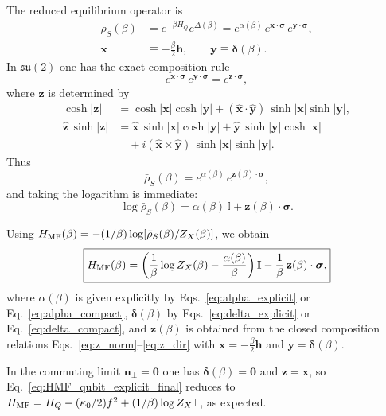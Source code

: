 The reduced equilibrium operator is
\begin{align}
    \bar\rho_S(\beta)&=e^{-\beta H_Q}e^{\Delta(\beta)}
    = e^{\alpha(\beta)}\,e^{\mathbf x\cdot\boldsymbol\sigma}\,e^{\mathbf y\cdot\boldsymbol\sigma}, \nonumber\\
    \mathbf x&\equiv -\frac{\beta}{2}\mathbf h,
    \qquad
    \mathbf y\equiv \boldsymbol\delta(\beta).
    \label{eq:bar_rho_qubit_xy}
\end{align}
In $\mathfrak{su}(2)$ one has the exact composition rule
\begin{equation}
    e^{\mathbf x\cdot\boldsymbol\sigma}\,e^{\mathbf y\cdot\boldsymbol\sigma}
    = e^{\mathbf z\cdot\boldsymbol\sigma},
    \label{eq:su2_comp_rule}
\end{equation}
where $\mathbf z$ is determined by
\begin{align}
    \cosh|\mathbf z|
    &=
    \cosh|\mathbf x|\cosh|\mathbf y|
    + (\hat{\mathbf x}\cdot\hat{\mathbf y})\,\sinh|\mathbf x|\sinh|\mathbf y|,
    \label{eq:z_norm}\\
    \hat{\mathbf z}\,\sinh|\mathbf z|
    &=
    \hat{\mathbf x}\,\sinh|\mathbf x|\cosh|\mathbf y|
    + \hat{\mathbf y}\,\sinh|\mathbf y|\cosh|\mathbf x| \nonumber\\
    &\quad + i(\hat{\mathbf x}\times\hat{\mathbf y})\,\sinh|\mathbf x|\sinh|\mathbf y|.
    \label{eq:z_dir}
\end{align}
Thus
\begin{equation}
    \bar\rho_S(\beta)=e^{\alpha(\beta)}\,e^{\mathbf z(\beta)\cdot\boldsymbol\sigma},
\end{equation}
and taking the logarithm is immediate:
\begin{equation}
    \log \bar\rho_S(\beta) = \alpha(\beta)\,\mathbb I + \mathbf z(\beta)\cdot\boldsymbol\sigma.
\end{equation}


Using $H_{\rm MF}(\beta)=-(1/\beta)\log[\bar\rho_S(\beta)/Z_X(\beta)]$, we obtain
\begin{equation}
    \boxed{
    H_{\rm MF}(\beta)
    =
    \left(
        \frac{1}{\beta}\log Z_X(\beta) - \frac{\alpha(\beta)}{\beta}
    \right)\mathbb I
    -\frac{1}{\beta}\,\mathbf z(\beta)\cdot\boldsymbol\sigma,
    }
    \label{eq:HMF_qubit_explicit_final}
\end{equation}
where $\alpha(\beta)$ is given explicitly by Eqs.~\eqref{eq:alpha_explicit} or Eq.~\eqref{eq:alpha_compact},
$\boldsymbol\delta(\beta)$ by Eqs.~\eqref{eq:delta_explicit} or Eq.~\eqref{eq:delta_compact},
and $\mathbf z(\beta)$ is obtained from the closed composition relations Eqs.~\eqref{eq:z_norm}--\eqref{eq:z_dir}
with $\mathbf x=-\frac{\beta}{2}\mathbf h$ and $\mathbf y=\boldsymbol\delta(\beta)$.

\medskip
In the commuting limit $\mathbf n_\perp=\mathbf 0$ one has $\boldsymbol\delta(\beta)=\mathbf 0$ and $\mathbf z=\mathbf x$,
so Eq.~\eqref{eq:HMF_qubit_explicit_final} reduces to
$H_{\rm MF}=H_Q-(\kappa_0/2)f^2+(1/\beta)\log Z_X\,\mathbb I$, as expected.
